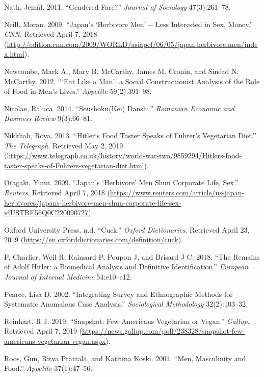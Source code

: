 \documentclass[twoside]{report}
\begin{document}
\hypertarget{nath}{Nath, Jemál. 2011. ``Gendered Fare?'' \emph{Journal of Sociology} 47(3):261--78.}

\hypertarget{neill}{Neill, Moran. 2009. ``Japan's `Herbivore Men' -\/- Less Interested in Sex, Money.'' \emph{CNN}. Retrieved April 7, 2018 (\url{http://edition.cnn.com/2009/WORLD/asiapcf/06/05/japan.herbivore.men/index.html}).}

\hypertarget{newcombe}{Newcombe, Mark A., Mary B. McCarthy, James M. Cronin, and Sinéad N. McCarthy. 2012. ```Eat Like a Man': a Social Constructionist Analysis of the Role of Food in Men's Lives.'' \emph{Appetite} 59(2):391--98.}

\hypertarget{nicolae}{Nicolae, Raluca. 2014. ``Soushoku(Kei) Danshi.'' \emph{Romanian Economic and Business Review} 9(3):66--81.}

\hypertarget{nikkhah}{Nikkhah, Roya. 2013. ``Hitler`s Food Taster Speaks of Führer's Vegetarian Diet.'' \emph{The Telegraph}. Retrieved May 2, 2019 (\url{https://www.telegraph.co.uk/history/world-war-two/9859294/Hitlers-food-taster-speaks-of-Fuhrers-vegetarian-diet.html}).}

\hypertarget{otagaki}{Otagaki, Yumi. 2009. ``Japan's `Herbivore' Men Shun Corporate Life, Sex.'' \emph{Reuters}. Retrieved April 7, 2018 (\url{https://www.reuters.com/article/us-japan-herbivores/japans-herbivore-men-shun-corporate-life-sex-idUSTRE56Q0C220090727}).}

\hypertarget{oxford}{Oxford University Press. n.d. ``Cuck.'' \emph{Oxford Dictionaries}. Retrieved April 23, 2019 (\url{https://en.oxforddictionaries.com/definition/cuck}).}

\hypertarget{p}{P, Charlier, Weil R, Rainsard P, Poupon J, and Brisard J C. 2018. ``The Remains of Adolf Hitler: a Biomedical Analysis and Definitive Identification.'' \emph{European Journal of Internal Medicine} 54:e10--e12.}

\hypertarget{pearce}{Pearce, Lisa D. 2002. ``Integrating Survey and Ethnographic Methods for Systematic Anomalous Case Analysis.'' \emph{Sociological Methodology} 32(2):103--32.}

\hypertarget{reinhart}{Reinhart, R J. 2019. ``Snapshot: Few Americans Vegetarian or Vegan.'' \emph{Gallup}. Retrieved April 7, 2019 (\href{https://news.gallup.com/poll/238328/snapshot-few-americans-vegetarian-ve-gan.aspx}{https://news.gallup.com/poll/238328/snapshot-few-americans-vegetarian-vegan.aspx}).}

\hypertarget{roos}{Roos, Gun, Ritva Prättälä, and Katriina Koski. 2001. ``Men, Masculinity and Food.'' \emph{Appetite} 37(1):47--56.}
\end{document}
